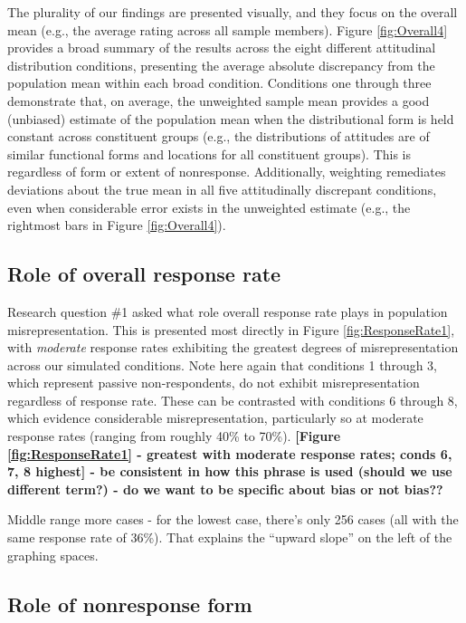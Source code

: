\documentclass[
  man,mask]{apa7}
\begin{document}
The plurality of our findings are presented visually, and they focus on the overall mean (e.g., the average rating across all sample members). Figure \ref{fig:Overall4} provides a broad summary of the results across the eight different attitudinal distribution conditions, presenting the average absolute discrepancy from the population mean within each broad condition. Conditions one through three demonstrate that, on average, the unweighted sample mean provides a good (unbiased) estimate of the population mean when the distributional form is held constant across constituent groups (e.g., the distributions of attitudes are of similar functional forms and locations for all constituent groups). This is regardless of form or extent of nonresponse. Additionally, weighting remediates deviations about the true mean in all five attitudinally discrepant conditions, even when considerable error exists in the unweighted estimate (e.g., the rightmost bars in Figure \ref{fig:Overall4}).

\hypertarget{role-of-overall-response-rate}{%
\subsection{Role of overall response rate}\label{role-of-overall-response-rate}}

Research question \#1 asked what role overall response rate plays in population misrepresentation. This is presented most directly in Figure \ref{fig:ResponseRate1}, with \emph{moderate} response rates exhibiting the greatest degrees of misrepresentation across our simulated conditions. Note here again that conditions 1 through 3, which represent passive non-respondents, do not exhibit misrepresentation regardless of response rate. These can be contrasted with conditions 6 through 8, which evidence considerable misrepresentation, particularly so at moderate response rates (ranging from roughly 40\% to 70\%). \textbf{{[}Figure \ref{fig:ResponseRate1} - greatest with moderate response rates; conds 6, 7, 8 highest{]} - be consistent in how this phrase is used (should we use different term?) - do we want to be specific about bias or not bias??}

Middle range more cases - for the lowest case, there's only 256 cases (all with the same response rate of 36\%). That explains the ``upward slope'' on the left of the graphing spaces.

\hypertarget{role-of-nonresponse-form}{%
\subsection{Role of nonresponse form}\label{role-of-nonresponse-form}}
\end{document}

